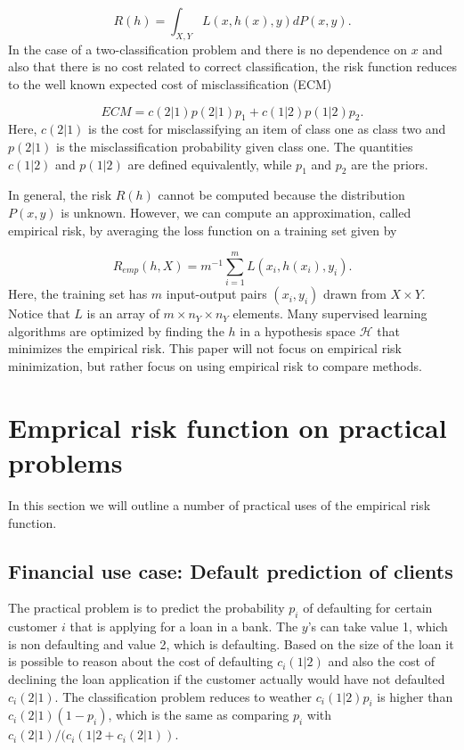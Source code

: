 \documentclass{article}
\theoremstyle{theorem}
\theoremstyle{definition}
\begin{document}
\begin{equation}
\label{def:risk}
R(h) = \int_{X,Y} L(x,h(x),y) dP(x,y).
\end{equation}
In the case of a two-classification problem and there is no dependence on $x$ and also that there is no cost related to correct classification, the risk function reduces to the well known expected cost of misclassification (ECM)

\begin{equation}
\label{eq:ecm}
ECM =  c(2|1)p(2|1)p_1  + c(1|2)p(1|2)p_2.
\end{equation}
Here, $c(2|1)$ is the cost for misclassifying an item of class one as class two and $p(2|1)$ is the misclassification probability given class one.  The quantities $c(1|2)$ and $p(1|2)$ are defined equivalently, while $p_1$ and $p_2$ are the priors.  

In general, the risk $R(h)$ cannot be computed because the distribution $P(x, y)$ is unknown.  However, we can compute an approximation, called empirical risk, by averaging the loss function on a training set given by 

\begin{equation}
\label{def:empRisk}
R_{emp}(h, X) = m^{-1} \sum_{i=1}^m L(x_i, h(x_i), y_i).
\end{equation}
Here, the training set has $m$ input-output pairs $(x_i, y_i)$ drawn from $X \times Y$.  Notice that $L$ is an array of $m \times n_Y \times n_Y$ elements.  Many supervised learning algorithms are optimized by finding the $h$ in a hypothesis space $\mathcal{H}$ that minimizes the empirical risk.  This paper will not focus on empirical risk minimization, but rather focus on using empirical risk to compare methods.

\section{Emprical risk function on practical problems}
\label{sec:practical}

In this section we will outline a number of practical uses of the empirical risk function.

\subsection{Financial use case: Default prediction of clients}
\label{sec:financial}

The practical problem is to predict the probability $p_i$ of defaulting for certain customer $i$ that is applying for a loan in a bank.  The $y$'s can take value 1, which is non defaulting and value 2, which is defaulting.  Based on the size of the loan it is possible to reason about the cost of defaulting $c_i(1|2)$ and also the cost of declining the loan application if the customer actually would have not defaulted $c_i(2|1)$.  The classification problem reduces to weather $c_i(1|2)p_i$ is higher than $c_i(2|1)(1-p_i)$, which is the same as comparing $p_i$ with $c_i(2|1)/(c_i(1|2 + c_i(2|1))$. 
\end{document}
